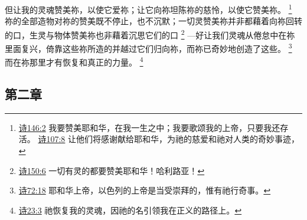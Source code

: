 \documentclass[12pt, a4paper, oneside]{ctexart}
\begin{document}
    但让我的灵魂赞美祢，以使它爱祢；让它向祢坦陈祢的慈怜，以使它赞美祢。
    \footnote {
		\href{https://biblehub.com/psalms/146-2.htm}{诗146:2} 我要赞美耶和华，在我一生之中；我要歌颂我的上帝，只要我还存活。
        \href{https://biblehub.com/psalms/107-8.htm}{诗107:8} 让他们将感谢献给耶和华，为祂的慈爱和祂对人类的奇妙事迹，
	}
    祢的全部造物对祢的赞美既不停止，也不沉默；一切灵赞美祢并非都藉着向祢回转的口，生灵与物体赞美祢也非藉着沉思它们的口
    \footnote {
		\href{https://biblehub.com/psalms/150-6.htm}{诗150:6} 一切有灵的都要赞美耶和华！哈利路亚！
	}
    ---好让我们灵魂从倦怠中在祢里面复兴，倚靠这些祢所造的并越过它们归向祢，而祢已奇妙地创造了这些。
    \footnote {
		\href{https://biblehub.com/psalms/72-18.htm}{诗72:18} 耶和华上帝，以色列的上帝是当受崇拜的，惟有祂行奇事。
	}
    而在祢那里才有恢复和真正的力量。
    \footnote {
		\href{https://biblehub.com/psalms/23-3.htm}{诗23:3} 祂恢复我的灵魂，因祂的名引领我在正义的路径上。
	}

\subsection{第二章}
\end{document}
